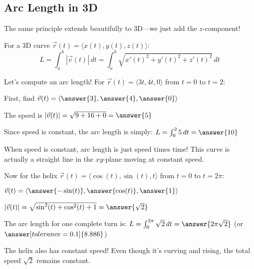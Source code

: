 \documentclass{ximera}
\begin{document}
\subsection*{Arc Length in 3D}

The same principle extends beautifully to 3D—we just add the $z$-component!

\begin{definition}
For a 3D curve $\vec{r}(t) = \langle x(t), y(t), z(t) \rangle$:
$$L = \int_a^b |\vec{v}(t)| \, dt = \int_a^b \sqrt{x'(t)^2+y'(t)^2+z'(t)^2} \, dt$$
\end{definition}

\begin{problem}
Let's compute an arc length! For $\vec{r}(t) = \langle 3t, 4t, 0 \rangle$ from $t=0$ to $t=2$:

First, find $\vec{v}(t) = \langle \answer{3}, \answer{4}, \answer{0} \rangle$

The speed is $|\vec{v}(t)| = \sqrt{9 + 16 + 0} = \answer{5}$

Since speed is constant, the arc length is simply:
$L = \int_0^2 5 \, dt = \answer{10}$

\begin{feedback}
When speed is constant, arc length is just speed times time! This curve is actually a straight line in the $xy$-plane moving at constant speed.
\end{feedback}
\end{problem}

\begin{problem}
Now for the helix $\vec{r}(t) = \langle \cos(t), \sin(t), t \rangle$ from $t=0$ to $t=2\pi$:

$\vec{v}(t) = \langle \answer{-\sin(t)}, \answer{\cos(t)}, \answer{1} \rangle$

$|\vec{v}(t)| = \sqrt{\sin^2(t) + \cos^2(t) + 1} = \answer{\sqrt{2}}$

The arc length for one complete turn is:
$L = \int_0^{2\pi} \sqrt{2} \, dt = \answer{2\pi\sqrt{2}}$ (or $\answer[tolerance=0.1]{8.886}$)

\begin{feedback}
The helix also has constant speed! Even though it's curving and rising, the total speed $\sqrt{2}$ remains constant.
\end{feedback}
\end{problem}
\end{document}
